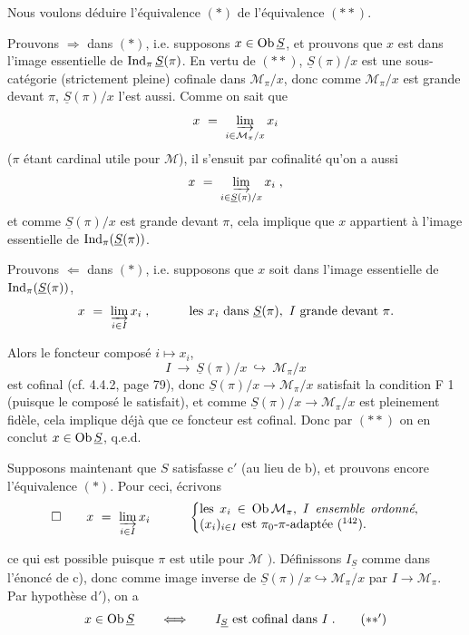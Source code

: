 Nous voulons déduire l'équivalence $(*)$ de l'équivalence $(**)$.

Prouvons $\Longrightarrow$ dans $(*)$, i.e. supposons $x \in \operatorname{Ob}\underline{S}$, et prouvons que $x$ est dans l'image essentielle de $\operatorname{Ind}_\pi\underline{S}(\pi)$. En vertu de $(**)$, $\underline{S}(\pi)/x$ est une sous-catégorie (strictement pleine) cofinale dans $\mathcal{M}_\pi/x$, donc comme $\mathcal{M}_\pi/x$ est grande devant $\pi$, $\underline{S}(\pi)/x$ l'est aussi. Comme on sait que
\[
x \ = \ \varinjlim_{i\in\mathcal{M}_\pi/x} x_i
\]
($\pi$ étant cardinal utile pour $\mathcal{M}$), il s'ensuit par cofinalité qu'on a aussi
\[
x \ = \ \varinjlim_{i\in\underline{S}(\pi)/x} x_i \; ,
\]
et comme $\underline{S}(\pi)/x$ est grande devant $\pi$, cela implique que $x$ appartient à l'image essentielle de $\operatorname{Ind}_\pi(\underline{S}(\pi))$.

Prouvons $\Longleftarrow$ dans $(*)$, i.e. supposons que $x$ soit dans l'image essentielle de $\operatorname{Ind}_\pi(\underline{S}(\pi))$,
\[
x \ = \ \varinjlim_{i\in I} x_i \; , \qquad\quad \text{les } x_i \text{ dans } \underline{S}(\pi),\ I \text{ grande devant } \pi.
\]

Alors le foncteur composé $i \longmapsto x_i$,
\[
I \ \longrightarrow \ \underline{S}(\pi)/x \ \hookrightarrow \ \mathcal{M}_\pi/x
\]
est cofinal (cf. 4.4.2, page 79), donc $\underline{S}(\pi)/x \longrightarrow \mathcal{M}_\pi/x$ satisfait la condition F 1 (puisque le composé le satisfait), et comme $\underline{S}(\pi)/x \longrightarrow \mathcal{M}_\pi/x$ est pleinement fidèle, cela implique déjà que ce foncteur est cofinal. Donc par $(**)$ on en conclut $x \in \operatorname{Ob}\underline{S}$, q.e.d.

Supposons maintenant que $S$ satisfasse c$'$ (au lieu de b), et prouvons encore l'équivalence $(*)$. Pour ceci, écrivons
\[
\square \qquad x \ = \ \varinjlim_{i\in I} x_i \qquad\quad
\left\{
\begin{minipage}[c]{0.5\textwidth}
les $x_i \in \Ob\mathcal{M}_\pi$, $I$ \textit{ensemble ordonné}, $(x_i)_{i\in I}$ est $\pi_0$-$\pi$-adaptée (\footnotemark[142]).
\end{minipage}
\right.
\]

ce qui est possible puisque $\pi$ est utile pour $\mathcal{M}$ $\Bigg)$. Définissons $I_{\underline{S}}$ comme dans l'énoncé de c), donc comme image inverse de $\underline{S}(\pi)/x \hookrightarrow \mathcal{M}_\pi/x$ par $I \longrightarrow \mathcal{M}_\pi$. Par hypothèse d$'$), on a
\[
x \in \Ob\underline{S} \qquad \Longleftrightarrow \qquad I_{\underline{S}} \text{ est cofinal dans } I \; . \tag*{$(**')$}
\]

